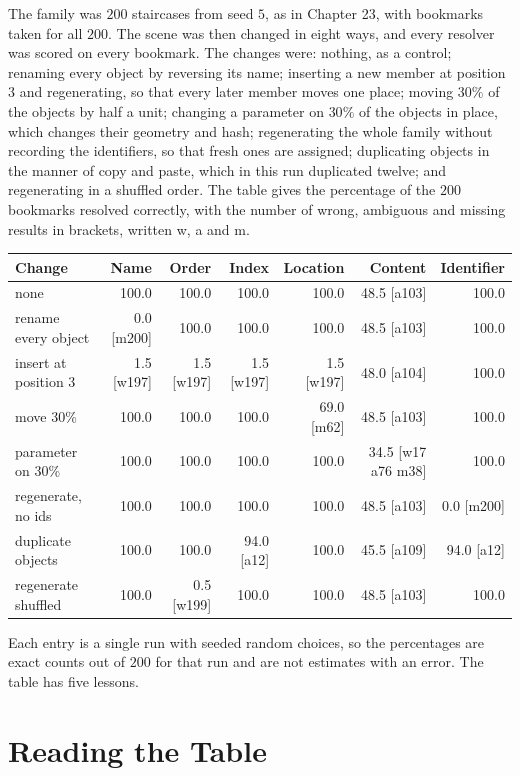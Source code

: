 The family was $200$ staircases from seed $5$, as in Chapter 23, with bookmarks taken for all $200$. The scene was then changed in eight ways, and every resolver was scored on every bookmark. The changes were: nothing, as a control; renaming every object by reversing its name; inserting a new member at position $3$ and regenerating, so that every later member moves one place; moving $30\%$ of the objects by half a unit; changing a parameter on $30\%$ of the objects in place, which changes their geometry and hash; regenerating the whole family without recording the identifiers, so that fresh ones are assigned; duplicating objects in the manner of copy and paste, which in this run duplicated twelve; and regenerating in a shuffled order. The table gives the percentage of the $200$ bookmarks resolved correctly, with the number of wrong, ambiguous and missing results in brackets, written w, a and m.

\begin{center}
\footnotesize
\setlength{\tabcolsep}{3pt}
\begin{tabular}{lrrrrrr}
\toprule
Change & Name & Order & Index & Location & Content & Identifier\\
\midrule
none & 100.0 & 100.0 & 100.0 & 100.0 & 48.5 [a103] & 100.0\\
rename every object & 0.0 [m200] & 100.0 & 100.0 & 100.0 & 48.5 [a103] & 100.0\\
insert at position 3 & 1.5 [w197] & 1.5 [w197] & 1.5 [w197] & 1.5 [w197] & 48.0 [a104] & 100.0\\
move 30\% & 100.0 & 100.0 & 100.0 & 69.0 [m62] & 48.5 [a103] & 100.0\\
parameter on 30\% & 100.0 & 100.0 & 100.0 & 100.0 & 34.5 [w17 a76 m38] & 100.0\\
regenerate, no ids & 100.0 & 100.0 & 100.0 & 100.0 & 48.5 [a103] & 0.0 [m200]\\
duplicate objects & 100.0 & 100.0 & 94.0 [a12] & 100.0 & 45.5 [a109] & 94.0 [a12]\\
regenerate shuffled & 100.0 & 0.5 [w199] & 100.0 & 100.0 & 48.5 [a103] & 100.0\\
\bottomrule
\end{tabular}
\end{center}

Each entry is a single run with seeded random choices, so the percentages are exact counts out of $200$ for that run and are not estimates with an error. The table has five lessons.

\section{Reading the Table}

